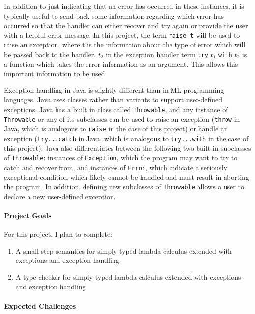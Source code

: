 \documentclass{article}
\begin{document}
In addition to just indicating that an error has occurred in these instances, it is typically useful to send back some information regarding which error has occurred so that the handler can either recover and try again or provide the user with a helpful error message. In this project, the term \texttt{raise t} will be used to raise an exception, where t is the information about the type of error which will be passed back to the handler. $t_{2}$ in the exception handler term \texttt{try} $t_{1}$ \texttt{with} $t_{2}$ is a function which takes the error information as an argument. This allows this important information to be used. 

Exception handling in Java is slightly different than in ML programming languages. Java uses classes rather than variants to support user-defined exceptions. Java has a built in class called \texttt{Throwable}, and any instance of \texttt{Throwable} or any of its subclasses can be used to raise an exception (\texttt{throw} in Java, which is analogous to \texttt{raise} in the case of this project) or handle an exception (\texttt{try...catch} in Java, which is analogous to \texttt{try...with} in the case of this project). Java also differentiates between the following two built-in subclasses of \texttt{Throwable}: instances of \texttt{Exception}, which the program may want to try to catch and recover from, and instances of \texttt{Error}, which indicate a seriously exceptional condition which likely cannot be handled and must result in aborting the program. In addition, defining new subclasses of \texttt{Throwable} allows a user to declare a new user-defined exception.  

\paragraph{Project Goals}

For this project, I plan to complete:
\begin{enumerate}
\item A small-step semantics for simply typed lambda calculus extended with exceptions and exception handling
\item A type checker for simply typed lambda calculus extended with exceptions and exception handling
\end{enumerate}

\paragraph{Expected Challenges}
\end{document}
